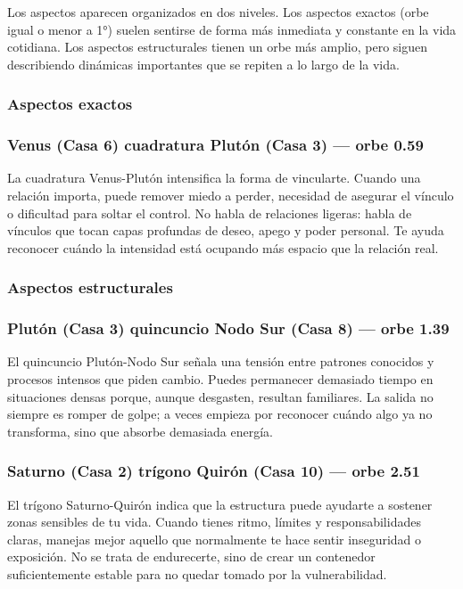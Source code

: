 \documentclass[11pt,a4paper]{article}
\begin{document}
Los aspectos aparecen organizados en dos niveles. Los aspectos exactos (orbe igual o menor a 1°) suelen sentirse de forma más inmediata y constante en la vida cotidiana. Los aspectos estructurales tienen un orbe más amplio, pero siguen describiendo dinámicas importantes que se repiten a lo largo de la vida.



\subsubsection*{Aspectos exactos}
\subsubsection*{Venus (Casa 6) cuadratura Plutón (Casa 3) --- orbe 0.59\textdegree}
La cuadratura Venus-Plutón intensifica la forma de vincularte. Cuando una relación importa, puede remover miedo a perder, necesidad de asegurar el vínculo o dificultad para soltar el control. No habla de relaciones ligeras: habla de vínculos que tocan capas profundas de deseo, apego y poder personal. Te ayuda reconocer cuándo la intensidad está ocupando más espacio que la relación real.

\subsubsection*{Aspectos estructurales}
\subsubsection*{Plutón (Casa 3) quincuncio Nodo Sur (Casa 8) --- orbe 1.39\textdegree}
El quincuncio Plutón-Nodo Sur señala una tensión entre patrones conocidos y procesos intensos que piden cambio. Puedes permanecer demasiado tiempo en situaciones densas porque, aunque desgasten, resultan familiares. La salida no siempre es romper de golpe; a veces empieza por reconocer cuándo algo ya no transforma, sino que absorbe demasiada energía.

\subsubsection*{Saturno (Casa 2) trígono Quirón (Casa 10) --- orbe 2.51\textdegree}
El trígono Saturno-Quirón indica que la estructura puede ayudarte a sostener zonas sensibles de tu vida. Cuando tienes ritmo, límites y responsabilidades claras, manejas mejor aquello que normalmente te hace sentir inseguridad o exposición. No se trata de endurecerte, sino de crear un contenedor suficientemente estable para no quedar tomado por la vulnerabilidad.
\end{document}
